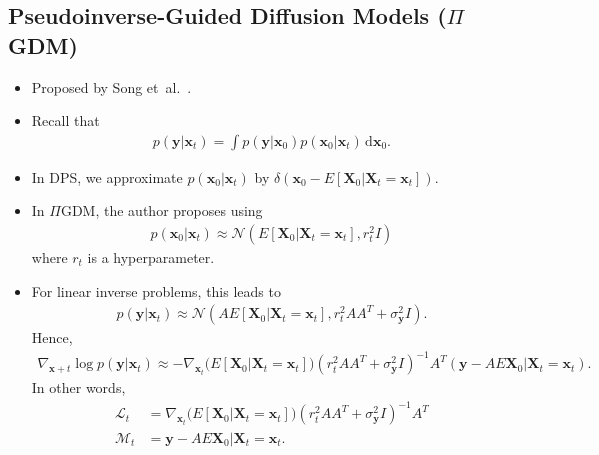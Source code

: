 \documentclass[10pt]{article}
\newcommand{\dee}{\mathrm{d}}
\newcommand{\ve}[1]{\mathbf{#1}}
\newcommand{\etal}{{et~al.}}
\newcommand{\mcal}[1]{\mathcal{#1}}
\begin{document}
\subsection{Pseudoinverse-Guided Diffusion Models ($\Pi$GDM)}

\begin{itemize}
  \item Proposed by Song \etal~\cite{Song:PiGDM:2023}.
  
  \item Recall that
  \begin{align*}
    p(\ve{y}|\ve{x}_t) = \int p(\ve{y}|\ve{x}_0) p(\ve{x}_0 | \ve{x}_t)\, \dee \ve{x}_0.
  \end{align*}

  \item In DPS, we approximate $p(\ve{x}_0|\ve{x}_t)$ by $\delta(\ve{x}_0 - E[\ve{X}_0|\ve{X}_t = \ve{x}_t])$.
  
  \item In $\Pi$GDM, the author proposes using
  \begin{align*}
      p(\ve{x}_0|\ve{x}_t) \approx \mcal{N}(E[\ve{X}_0|\ve{X}_t=\ve{x}_t], r_t^2 I)
  \end{align*}
  where $r_t$ is a hyperparameter.

  \item For linear inverse problems, this leads to
  \begin{align*}
    p(\ve{y}|\ve{x}_t) \approx \mcal{N}(AE[\ve{X}_0|\ve{X}_t=\ve{x}_t], r_t^2 AA^T + \sigma_{\ve{y}}^2 I).
  \end{align*}
  Hence,
  \begin{align*}
    \nabla_{\ve{x}+t} \log  p(\ve{y}|\ve{x}_t) \approx - \nabla_{\ve{x}_t} \big( E[\ve{X}_0|\ve{X}_t = \ve{x}_t] \big) (r_t^2 AA^T + \sigma_{\ve{y}}^2I)^{-1} A^T (\ve{y} - AE{\ve{X}_0|\ve{X}_t = \ve{x}_t}).
  \end{align*}
  In other words,
  \begin{align*}
    \mcal{L}_t &= \nabla_{\ve{x}_t} \big( E[\ve{X}_0|\ve{X}_t = \ve{x}_t] \big) (r_t^2 AA^T + \sigma_{\ve{y}}^2I)^{-1} A^T \\
    \mcal{M}_t &= \ve{y} - AE{\ve{X}_0|\ve{X}_t = \ve{x}_t}.
  \end{align*}
\end{itemize}


  
\end{document}
